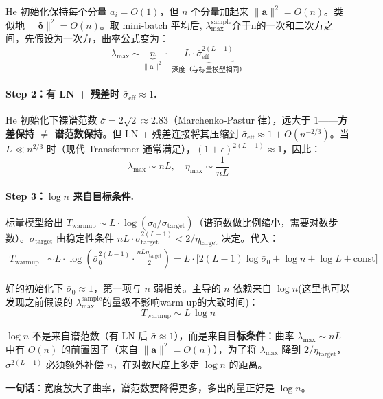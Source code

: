 \documentclass[12pt, a4paper]{ctexart}
\begin{document}
He 初始化保持每个分量 $a_i = O(1)$，但 $n$ 个分量加起来 $\|\mathbf{a}\|^2 = O(n)$。类似地 $\|\boldsymbol{\delta}\|^2 = O(n)$。取 mini-batch 平均后, $\lambda_{\max}^{\text{sample}}$介于n的一次和二次方之间，先假设为一次方，曲率公式变为：
\begin{equation}
    \lambda_{\max} \sim \underbrace{n}_{\|\mathbf{a}\|^2} \cdot\; \underbrace{L \cdot \bar{\sigma}_{\text{eff}}^{2(L-1)}}_{\text{深度（与标量模型相同）}}
\end{equation}

\paragraph{Step 2：有 LN + 残差时 $\bar{\sigma}_{\text{eff}} \approx 1$.}

He 初始化下裸谱范数 $\bar{\sigma} = 2\sqrt{2} \approx 2.83$（Marchenko-Pastur 律），远大于 $1$——\textbf{方差保持 $\neq$ 谱范数保持}。但 LN + 残差连接将其压缩到 $\bar{\sigma}_{\text{eff}} \approx 1 + O(n^{-2/3})$。当 $L \ll n^{2/3}$ 时（现代 Transformer 通常满足），$(1+\epsilon)^{2(L-1)} \approx 1$，因此：
\begin{equation}
    \boxed{\lambda_{\max} \sim nL, \quad \eta_{\max} \sim \frac{1}{nL}}
\end{equation}

\paragraph{Step 3：$\log n$ 来自目标条件.}

标量模型给出 $T_{\text{warmup}} \sim L \cdot \log(\bar{\sigma}_0/\bar{\sigma}_{\text{target}})$（谱范数做比例缩小，需要对数步数）。$\bar{\sigma}_{\text{target}}$ 由稳定性条件 $nL \cdot \bar{\sigma}_{\text{target}}^{2(L-1)} < 2/\eta_{\text{target}}$ 决定。代入：
\begin{align}
    T_{\text{warmup}} &\sim L \cdot \log\!\left(\bar{\sigma}_0^{2(L-1)} \cdot \frac{nL\eta_{\text{target}}}{2}\right) = L \cdot \bigl[2(L\!-\!1)\log\bar{\sigma}_0 + \log n + \log L + \text{const}\bigr]
\end{align}

好的初始化下 $\bar{\sigma}_0 \approx 1$，第一项与 $n$ 弱相关。主导的 $n$ 依赖来自 $\log n$(这里也可以发现之前假设的 $\lambda_{\max}^{\text{sample}}$的量级不影响warm up的大致时间)：
\begin{equation}
    \boxed{T_{\text{warmup}} \sim L\,\log n}
\end{equation}

\begin{insight}
$\log n$ 不是来自谱范数（有 LN 后 $\bar{\sigma} \approx 1$），而是来自\textbf{目标条件}：曲率 $\lambda_{\max} \sim nL$ 中有 $O(n)$ 的前置因子（来自 $\|\mathbf{a}\|^2 = O(n)$），为了将 $\lambda_{\max}$ 降到 $2/\eta_{\text{target}}$，$\bar{\sigma}^{2(L-1)}$ 必须额外补偿 $n$，在对数尺度上多走 $\log n$ 的距离。

\textbf{一句话}：宽度放大了曲率，谱范数要降得更多，多出的量正好是 $\log n$。
\end{insight}
\end{document}
